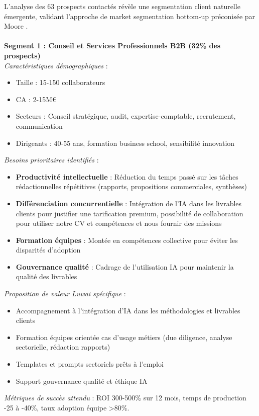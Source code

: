 L'analyse des 63 prospects contactés révèle une segmentation client naturelle émergente, validant l'approche de market segmentation bottom-up préconisée par Moore \cite{moore2014crossing}.
\\\\
\textbf{Segment 1 : Conseil et Services Professionnels B2B (32\% des prospects)}\\
\emph{Caractéristiques démographiques} :
\begin{itemize}
    \item Taille : 15-150 collaborateurs
    \item CA : 2-15M€
    \item Secteurs : Conseil stratégique, audit, expertise-comptable, recrutement, communication
    \item Dirigeants : 40-55 ans, formation business school, sensibilité innovation
\end{itemize}
\medskip
\emph{Besoins prioritaires identifiés} \cite{luwai2025segmentation} :
\begin{itemize}
    \item \textbf{Productivité intellectuelle} : Réduction du temps passé sur les tâches rédactionnelles répétitives (rapports, propositions commerciales, synthèses)
    \item \textbf{Différenciation concurrentielle} : Intégration de l'IA dans les livrables clients pour justifier une tarification premium, possibilité de collaboration pour utiliser notre CV et compétences et nous fournir des missions
    \item \textbf{Formation équipes} : Montée en compétences collective pour éviter les disparités d'adoption
    \item \textbf{Gouvernance qualité} : Cadrage de l'utilisation IA pour maintenir la qualité des livrables
\end{itemize}
\medskip
\emph{Proposition de valeur Luwai spécifique} :
\begin{itemize}
    \item Accompagnement à l'intégration d'IA dans les méthodologies et livrables clients
    \item Formation équipes orientée cas d'usage métiers (due diligence, analyse sectorielle, rédaction rapports)
    \item Templates et prompts sectoriels prêts à l'emploi
    \item Support gouvernance qualité et éthique IA
\end{itemize}
\medskip
\emph{Métriques de succès attendu} : ROI 300-500\% sur 12 mois, temps de production -25 à -40\%, taux adoption équipe >80\%.
